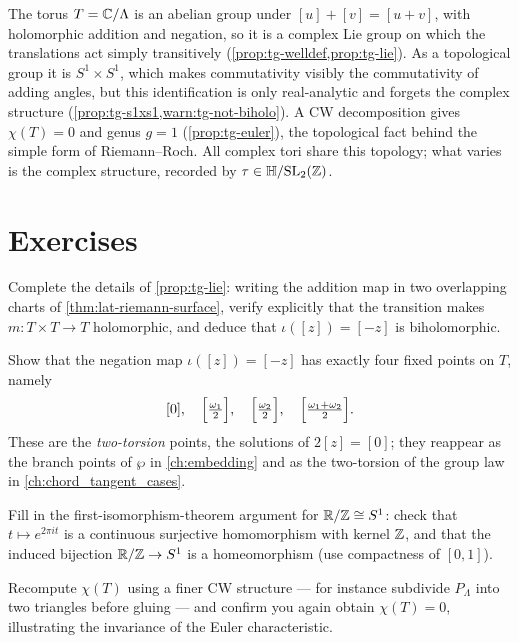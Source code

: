 The torus \(T = \mathbb{C}/\Lambda\) is an abelian group under \([u]+[v]=[u+v]\), with
holomorphic addition and negation, so it is a complex Lie group on which the
translations act simply transitively (\cref{prop:tg-welldef,prop:tg-lie}). As a
topological group it is \(S^1 \times S^1\), which makes commutativity visibly the
commutativity of adding angles, but this identification is only real-analytic and
forgets the complex structure (\cref{prop:tg-s1xs1,warn:tg-not-biholo}). A CW
decomposition gives \(\chi(T) = 0\) and genus \(g = 1\)
(\cref{prop:tg-euler}), the topological fact behind the simple form of
Riemann--Roch. All complex tori share this topology; what varies is the complex
structure, recorded by \(\tau \in \mathbb{H}/\mathrm{SL}_2(\mathbb{Z})\).

\section*{Exercises}

\begin{exercise}
\label{ex:tg-lie-holo}
Complete the details of \cref{prop:tg-lie}: writing the addition map in two
overlapping charts of \cref{thm:lat-riemann-surface}, verify explicitly that the
transition makes \(m : T \times T \to T\) holomorphic, and deduce that
\(\iota([z]) = [-z]\) is biholomorphic.
\end{exercise}

\begin{exercise}
\label{ex:tg-two-torsion}
Show that the negation map \(\iota([z]) = [-z]\) has exactly four fixed points on
\(T\), namely
\[
  [0],\quad \Bigl[\tfrac{\omega_1}{2}\Bigr],\quad
  \Bigl[\tfrac{\omega_2}{2}\Bigr],\quad
  \Bigl[\tfrac{\omega_1+\omega_2}{2}\Bigr].
\]
These are the \emph{two-torsion} points, the solutions of \(2[z] = [0]\); they
reappear as the branch points of \(\wp\) in \cref{ch:embedding} and as the
two-torsion of the group law in \cref{ch:chord_tangent_cases}.
\end{exercise}

\begin{exercise}
\label{ex:tg-first-iso}
Fill in the first-isomorphism-theorem argument for \(\mathbb{R}/\mathbb{Z} \cong S^1\): check
that \(t \mapsto e^{2\pi i t}\) is a continuous surjective homomorphism with
kernel \(\mathbb{Z}\), and that the induced bijection \(\mathbb{R}/\mathbb{Z} \to S^1\) is a
homeomorphism (use compactness of \([0,1]\)).
\end{exercise}

\begin{exercise}
\label{ex:tg-euler-refine}
Recompute \(\chi(T)\) using a finer CW structure --- for instance subdivide
\(P_\Lambda\) into two triangles before gluing --- and confirm you again obtain
\(\chi(T) = 0\), illustrating the invariance of the Euler characteristic.
\end{exercise}

